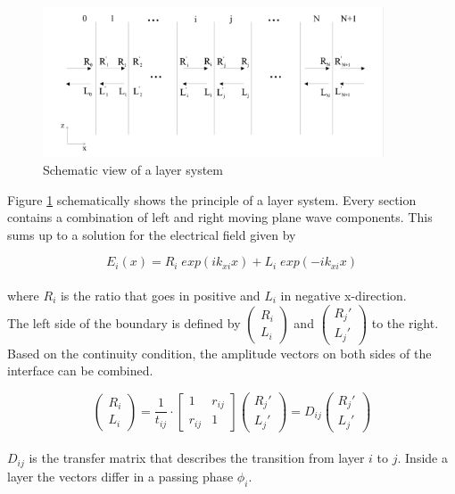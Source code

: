 \begin{figure}[ht]
	\centering
	\includegraphics[width = 0.9\textwidth]{05_OUSD/images/SchemaSchichtsystem.png}
	\caption[Schematic of a layersystem]{Schematic view of a layer system \cite{Podgorsek:Vielfachschichten}}
	\label{fig:schemlayer}
\end{figure}

Figure \ref{fig:schemlayer} schematically shows the principle of a layer system. Every section contains a combination of left and right moving plane wave components. This sums up to a solution for the electrical field given by

\begin{equation}
E_i(x) = R_i\;exp(ik_{xi}x) + L_i\;exp(-ik_{xi}x) 
\label{eq:E_i}
\end{equation}
\\
where $ R_i $ is the ratio that goes in positive and $L_i$ in negative x-direction. \\
The left side of the boundary is defined by $ \begin{pmatrix}R_i \\ L_i\end{pmatrix} $  and $ \begin{pmatrix}R_j' \\ L_j'\end{pmatrix}  $ to the right. Based on the continuity condition, the amplitude vectors on both sides of the interface can be combined. 

\begin{equation}
\begin{pmatrix}R_i \\ L_i\end{pmatrix}  = \frac{1}{t_{ij}} \cdot 
\begin{bmatrix}
1 & r_{ij} \\ r_{ij} & 1
\end{bmatrix}  \begin{pmatrix}R_j' \\ L_j'\end{pmatrix}  = D_{ij} \begin{pmatrix}R_j' \\ L_j'\end{pmatrix} 
\label{eq:DMat}
\end{equation}
\\
$D_{ij}$ is the transfer matrix that describes the transition from layer $i$ to $j$. Inside a layer the vectors differ in a passing phase $\phi_i$.

